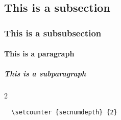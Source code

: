 \blah

\subsection{This is a subsection}

\blah

\subsubsection{This is a subsubsection}

\blah

\paragraph{This is a paragraph}

\blah

\subparagraph{This is a subparagraph}

\blah

\setcounter {secnumdepth} {2}

\begin{verbatim}
  \setcounter {secnumdepth} {2}
\end{verbatim}
